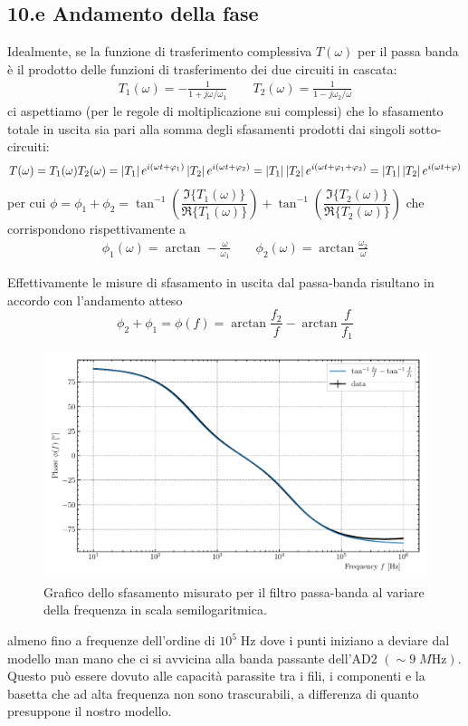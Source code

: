 \documentclass[10pt, a4paper, italian]{article}
\begin{document}
\subsection*{10.e Andamento della fase}
Idealmente, se la funzione di trasferimento complessiva $T(\omega)$ per il
passa banda è il prodotto delle funzioni di trasferimento dei due circuiti in
cascata:
\begin{align*}
T_1(\omega) = -\frac{1}{1 + j \omega/\omega_1} \qquad
T_2(\omega) = \frac{1}{1 - j \omega_2/\omega}
\end{align*}
ci aspettiamo (per le regole di moltiplicazione sui complessi) che lo
sfasamento totale in uscita sia pari alla somma degli sfasamenti prodotti dai
singoli sotto-circuiti:
\[
T(\omega) = T_1(\omega) T_2(\omega) =
\left| T_1 \right| e^{i (\omega t + \varphi_1)} \left| T_2 \right| e^{i (\omega t + \varphi_2)} =
\left| T_1 \right| \left| T_2 \right| e^{i (\omega t + \varphi_1 + \varphi_2)} =
\left| T_1 \right| \left| T_2 \right| e^{i (\omega t + \varphi)}
\]
per cui $\phi = \phi_1 + \phi_2 =
\tan^{-1} \left( \dfrac{\Im{\{T_1(\omega)\}}}{\Re{\{T_1(\omega)\}}} \right) +
\tan^{-1} \left( \dfrac{\Im{\{T_2(\omega)\}}}{\Re{\{T_2(\omega)\}}} \right)$
che corrispondono rispettivamente a
\begin{align*}
\phi_1(\omega) = \arctan - \frac{\omega}{\omega_1} \qquad
\phi_2(\omega) = \arctan \frac{\omega_2}{\omega}
\end{align*}

Effettivamente le misure di sfasamento in uscita dal passa-banda risultano
in accordo con l'andamento atteso
\begin{equation}
\phi_2 + \phi_1 = \phi(f) = \arctan{\frac{f_2}{f}} - \arctan{\frac{f}{f_1}}
\end{equation}
\begin{figure}[htb]
\centering
\includegraphics[scale=0.7]{bpfphase}
\caption{Grafico dello sfasamento misurato per il filtro passa-banda al
variare della frequenza in scala semilogaritmica.}
\end{figure}
almeno fino a frequenze dell'ordine di $10^5 \; \si{\Hz}$ dove i punti
iniziano a deviare dal modello man mano che ci si avvicina alla banda
passante dell'AD2 $(\sim 9 \; \si{M\Hz})$. Questo può essere dovuto alle
capacità parassite tra i fili, i componenti e la basetta che ad alta
frequenza non sono trascurabili, a differenza di quanto presuppone il nostro
modello.
\end{document}

